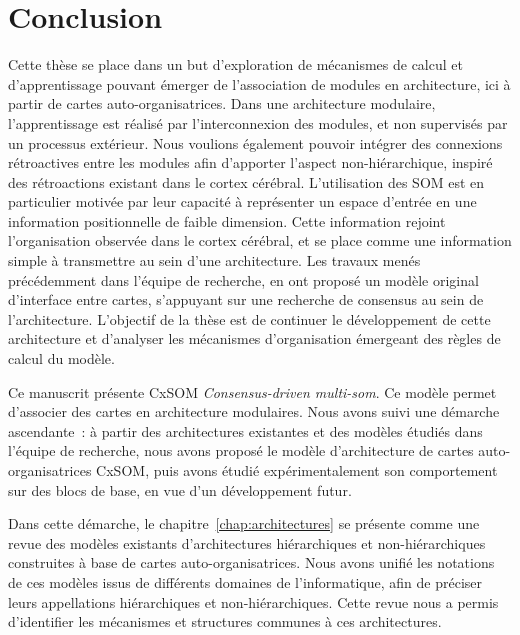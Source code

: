 \chapter*{Conclusion}

Cette thèse se place dans un but d'exploration de mécanismes de calcul et d'apprentissage pouvant émerger de l'association de modules en architecture, ici à partir de cartes auto-organisatrices.
Dans une architecture modulaire, l'apprentissage est réalisé par l'interconnexion des modules, et non supervisés par un processus extérieur. Nous voulions également pouvoir intégrer des connexions rétroactives entre les modules afin d'apporter l'aspect non-hiérarchique, inspiré des rétroactions existant dans le cortex cérébral. 
L'utilisation des SOM est en particulier motivée par leur capacité à représenter un espace d'entrée en une information positionnelle de faible dimension. Cette information rejoint l'organisation observée dans le cortex cérébral, et se place comme une information simple à transmettre au sein d'une architecture.
Les travaux menés précédemment dans l'équipe de recherche, en \cite{menard05,khouzam_2013,baheux_towards_2014} ont proposé un modèle original d'interface entre cartes, s'appuyant sur une recherche de consensus au sein de l'architecture. L'objectif de la thèse est de continuer le développement de cette architecture et d'analyser les mécanismes d'organisation émergeant des règles de calcul du modèle. 


Ce manuscrit présente CxSOM \emph{Consensus-driven multi-som}. Ce modèle permet d'associer des cartes en architecture modulaires.
Nous avons suivi une démarche ascendante~: à partir des architectures existantes et des modèles étudiés dans l'équipe de recherche, nous avons proposé le modèle d'architecture de cartes auto-organisatrices CxSOM, puis avons étudié expérimentalement son comportement sur des blocs de base, en vue d'un développement futur.

Dans cette démarche, le chapitre~\ref{chap:architectures} se présente comme une revue des modèles existants d'architectures hiérarchiques et non-hiérarchiques construites à base de cartes auto-organisatrices. 
Nous avons unifié les notations de ces modèles issus de différents domaines de l'informatique, afin de préciser leurs appellations hiérarchiques et non-hiérarchiques. Cette revue nous a permis d'identifier les mécanismes et structures communes à ces architectures.

